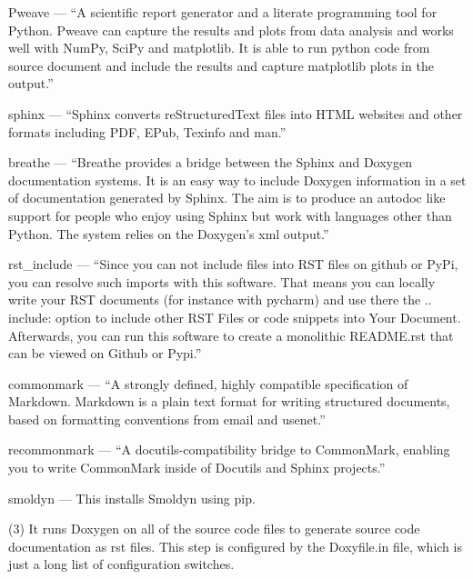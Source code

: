 \documentclass {scrbook}
\begin{document}
\begin{description}

\item{Pweave} --- ``A scientific report generator and a literate programming tool for Python. Pweave can capture the results and plots from data analysis and works well with NumPy, SciPy and matplotlib. It is able to run python code from source document and include the results and capture matplotlib plots in the output.''

\item{sphinx} --- ``Sphinx converts reStructuredText files into HTML websites and other formats including PDF, EPub, Texinfo and man.''

\item{breathe} --- ``Breathe provides a bridge between the Sphinx and Doxygen documentation systems. It is an easy way to include Doxygen information in a set of documentation generated by Sphinx. The aim is to produce an autodoc like support for people who enjoy using Sphinx but work with languages other than Python. The system relies on the Doxygen's xml output.''

\item{rst\_include} --- ``Since you can not include files into RST files on github or PyPi, you can resolve such imports with this software. That means you can locally write your RST documents (for instance with pycharm) and use there the .. include: option to include other RST Files or code snippets into Your Document. Afterwards, you can run this software to create a monolithic README.rst that can be viewed on Github or Pypi.''

\item{commonmark} --- ``A strongly defined, highly compatible specification of Markdown. Markdown is a plain text format for writing structured documents, based on formatting conventions from email and usenet.''

\item{recommonmark} --- ``A docutils-compatibility bridge to CommonMark, enabling you to write CommonMark inside of Docutils and Sphinx projects.''

\item{smoldyn} --- This installs Smoldyn using pip.

\end{description}

(3) It runs Doxygen on all of the source code files to generate source code documentation as rst files. This step is configured by the Doxyfile.in file, which is just a long list of configuration switches.
\end{document}
